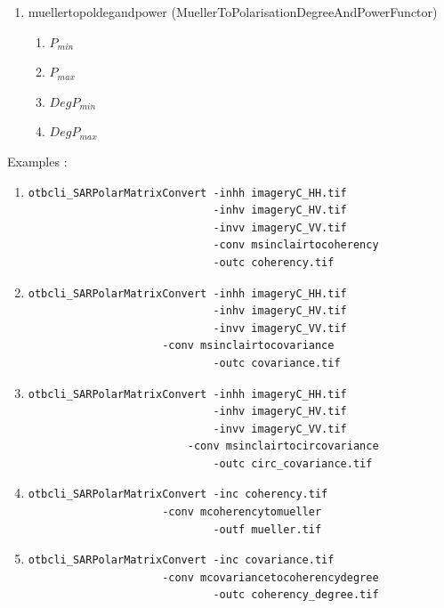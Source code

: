 \begin{enumerate}
\item muellertopoldegandpower (MuellerToPolarisationDegreeAndPowerFunctor)
\begin{enumerate}
\item $ P_{min} $ 
\item $ P_{max} $ 
\item $ DegP_{min} $ 
\item $ DegP_{max} $
\end{enumerate}

\end{enumerate}

Examples :

\begin{enumerate}
\item 
\begin{verbatim} 
otbcli_SARPolarMatrixConvert -inhh imageryC_HH.tif 
                             -inhv imageryC_HV.tif 
                             -invv imageryC_VV.tif
                             -conv msinclairtocoherency
                             -outc coherency.tif 
\end{verbatim}
									  
\item 
\begin{verbatim} 
otbcli_SARPolarMatrixConvert -inhh imageryC_HH.tif 
                             -inhv imageryC_HV.tif 
                             -invv imageryC_VV.tif
		             -conv msinclairtocovariance
                             -outc covariance.tif 
\end{verbatim}
									  
\item 
\begin{verbatim} 
otbcli_SARPolarMatrixConvert -inhh imageryC_HH.tif 
                             -inhv imageryC_HV.tif 
                             -invv imageryC_VV.tif
	                     -conv msinclairtocircovariance
                             -outc circ_covariance.tif 
\end{verbatim}
									  
\item 
\begin{verbatim} 
otbcli_SARPolarMatrixConvert -inc coherency.tif 
		             -conv mcoherencytomueller
                             -outf mueller.tif 
\end{verbatim}
									  
\item 
\begin{verbatim} 
otbcli_SARPolarMatrixConvert -inc covariance.tif 
		             -conv mcovariancetocoherencydegree
                             -outc coherency_degree.tif 
\end{verbatim}
									  

\end{enumerate}
